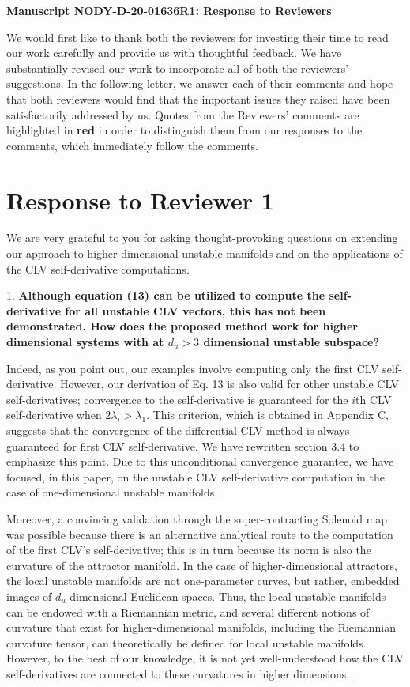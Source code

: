 \documentclass[11pt]{article}
\title{}
\author{}
\date{30th October 2020}
\newcommand{\highlight}[1]{{\color{burgundy}\textbf{#1}}}
\begin{document}
\begin{center}
		\Large{\textbf{Manuscript NODY-D-20-01636R1: Response to Reviewers}}
\end{center}
\medskip
We would first like to thank both the reviewers for investing their time to read our work carefully and provide us with thoughtful feedback. We have substantially revised our work to incorporate all of both the reviewers' suggestions. In the following letter, we answer each of their comments and hope that both reviewers would find that the 
important issues they raised have been satisfactorily addressed by us.
Quotes from the Reviewers' comments are highlighted in 
\highlight{red} in order to distinguish them from our responses to the comments, which immediately follow the comments. 
\section{Response to Reviewer 1}
We are very grateful to you for asking thought-provoking
questions on extending our approach to higher-dimensional unstable manifolds 
and on the applications of the CLV self-derivative computations.

1. \highlight{Although equation (13) can be utilized to compute 
the self-derivative for all unstable CLV vectors, this has not
been demonstrated. How does the proposed method work for 
higher dimensional systems with at $d_u > 3$ dimensional unstable subspace?}

Indeed, as you point out, our examples involve computing only the first CLV self-derivative. However, our derivation of Eq. 13 is also valid for other unstable CLV self-derivatives; convergence to the self-derivative is guaranteed for the $i$th CLV self-derivative when $2\lambda_i > \lambda_1$. This criterion, which is obtained in Appendix C, suggests that the convergence of the differential CLV method is always guaranteed for first CLV self-derivative. We have rewritten section 3.4 to emphasize this point. Due to this unconditional convergence guarantee, we have focused, in this paper, on the unstable CLV self-derivative computation in the case of one-dimensional unstable manifolds.  
 
Moreover, a convincing validation through the 
super-contracting Solenoid map was possible because there is an alternative analytical route to the computation of the first CLV's self-derivative; this is in turn because its norm is also the curvature of the attractor manifold. In the case of higher-dimensional attractors, the local unstable manifolds are not one-parameter curves, but rather, embedded images of $d_u$ dimensional Euclidean spaces. Thus, the local unstable manifolds can be endowed with a Riemannian metric, and several different notions of curvature that exist for higher-dimensional manifolds, including the Riemannian curvature tensor, can theoretically be defined for local unstable manifolds. However, to the best of our knowledge, it is not yet well-understood how the CLV self-derivatives are connected to these curvatures in higher dimensions.
\end{document}
